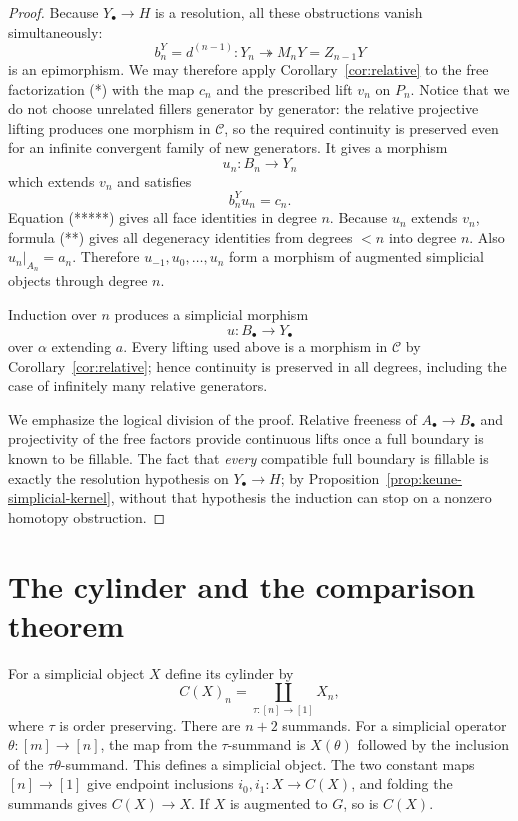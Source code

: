 \documentclass[10pt,a4paper]{amsart}
\newcommand{\C}{\mathcal C}
\begin{document}
\begin{proof}
Because $Y_\bullet\to H$ is a resolution, all these obstructions
vanish simultaneously:
\[
 b_n^Y=d^{(n-1)}:Y_n\twoheadrightarrow
 M_nY=Z_{n-1}Y
\]
is an epimorphism.  We may therefore apply
Corollary~\ref{cor:relative} to the free factorization (*) with the map
$c_n$ and the prescribed lift $v_n$ on $P_n$.  Notice that we do not
choose unrelated fillers generator by generator: the relative
projective lifting produces one morphism in $\C$, so the required
continuity is preserved even for an infinite convergent family of new
generators. It gives a morphism
\[
 u_n:B_n\longrightarrow Y_n
\]
which extends $v_n$ and satisfies
\[
 b_n^Yu_n=c_n.                               \tag{*****}
\]
Equation (*****) gives all face identities in degree $n$.  Because
$u_n$ extends $v_n$, formula (**) gives all degeneracy identities from
degrees $<n$ into degree $n$.  Also $u_n|_{A_n}=a_n$.  Therefore
$u_{-1},u_0,\ldots,u_n$ form a morphism of augmented simplicial objects
through degree $n$.

Induction over $n$ produces a simplicial morphism
\[
 u:B_\bullet\longrightarrow Y_\bullet
\]
over $\alpha$ extending $a$.  Every lifting used above is a morphism in
$\C$ by Corollary~\ref{cor:relative}; hence continuity is preserved in
all degrees, including the case of infinitely many relative generators.

We emphasize the logical division of the proof. Relative freeness of
$A_\bullet\to B_\bullet$ and projectivity of the free factors provide
continuous lifts once a full boundary is known to be fillable. The
fact that \emph{every} compatible full boundary is fillable is exactly
the resolution hypothesis on $Y_\bullet\to H$; by
Proposition~\ref{prop:keune-simplicial-kernel}, without that hypothesis
the induction can stop on a nonzero homotopy obstruction.
\end{proof}

\section{The cylinder and the comparison theorem}

For a simplicial object $X$ define its cylinder by
\begin{equation}\label{eq:cylinder}
 C(X)_n=\coprod_{\tau:[n]\to[1]}X_n,
\end{equation}
where $\tau$ is order preserving. There are $n+2$ summands.
For a simplicial operator $\theta:[m]\to[n]$, the map from the
$\tau$-summand is $X(\theta)$ followed by the inclusion of the
$\tau\theta$-summand. This defines a simplicial object.
The two constant maps $[n]\to[1]$ give endpoint inclusions
$i_0,i_1:X\to C(X)$, and folding the summands gives $C(X)\to X$.
If $X$ is augmented to $G$, so is $C(X)$.
\end{document}
